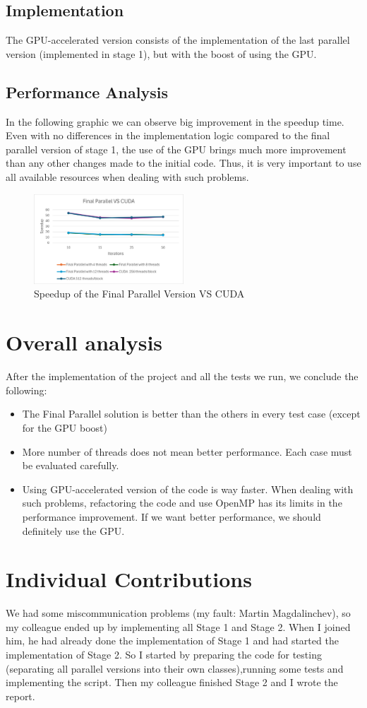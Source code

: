 \documentclass[sigconf]{acmart}
\begin{document}
\subsection{Implementation}
The GPU-accelerated version consists of the implementation of the last parallel version (implemented in stage 1), but with the boost of using the GPU.
\subsection{Performance Analysis}
In the following graphic we can observe big improvement in the speedup time. Even with no differences in the implementation logic compared to the final parallel version of stage 1, the use of the GPU brings much more improvement than any other changes made to the initial code. Thus, it is very important to use all available resources when dealing with such problems.
\begin{figure}[h]
    \centering
    \includegraphics[width=0.5\textwidth]{CUDA.png}
    \caption{Speedup of the Final Parallel Version VS CUDA}
\end{figure}

\section{Overall analysis}
After the implementation of the project and all the tests we run, we conclude the following:
\begin{itemize}
    \item The Final Parallel solution is better than the others in every test case (except for the GPU boost)
    \item More number of threads does not mean better performance. Each case must be evaluated carefully.
    \item Using GPU-accelerated version of the code is way faster. When dealing with such problems, refactoring the code and use OpenMP has its limits in the performance improvement. If we want better performance, we should definitely use the GPU.
\end{itemize}
\section{Individual Contributions}
We had some miscommunication problems (my fault: Martin Magdalinchev), so my colleague ended up by implementing all Stage 1 and Stage 2. When I joined him, he had already done the implementation of Stage 1 and had started the implementation of Stage 2. So I started by preparing the code for testing (separating all parallel versions into their own classes),running some tests and implementing the script. Then my colleague finished Stage 2 and I wrote the report.  
\end{document}
